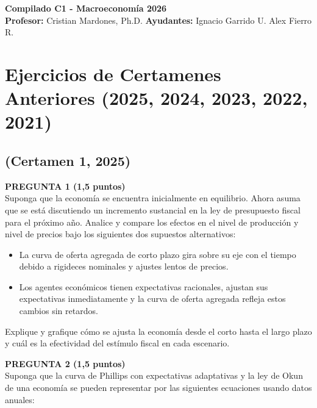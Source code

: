 \documentclass[11pt,addpoints]{article}
\begin{document}
\vspace*{0.01cm}

\begin{center}
{\Large \bfseries Compilado C1 - Macroeconomía 2026 \\[0.5cm]}
\textbf{Profesor:} Cristian Mardones, Ph.D. \quad \textbf{Ayudantes:} Ignacio Garrido U. Alex Fierro R.
\end{center}

\section*{\textbf{Ejercicios de Certamenes Anteriores (2025, 2024, 2023, 2022, 2021)}}

\subsection*{(Certamen 1, 2025)}

\textbf{PREGUNTA 1 (1,5 puntos)}\\[0.3cm]
Suponga que la economía se encuentra inicialmente en equilibrio. Ahora asuma que se está discutiendo un incremento sustancial en la ley de presupuesto fiscal para el próximo año. Analice y compare los efectos en el nivel de producción y nivel de precios bajo los siguientes dos supuestos alternativos:

\begin{itemize}
  \item La curva de oferta agregada de corto plazo gira sobre su eje con el tiempo debido a rigideces nominales y ajustes lentos de precios.
  \item Los agentes económicos tienen expectativas racionales, ajustan sus expectativas inmediatamente y la curva de oferta agregada refleja estos cambios sin retardos.
\end{itemize}

Explique y grafique cómo se ajusta la economía desde el corto hasta el largo plazo y cuál es la efectividad del estímulo fiscal en cada escenario.

\vspace{0.8cm}

\textbf{PREGUNTA 2 (1,5 puntos)}\\[0.3cm]
Suponga que la curva de Phillips con expectativas adaptativas y la ley de Okun de una economía se pueden representar por las siguientes ecuaciones usando datos anuales:
\end{document}
